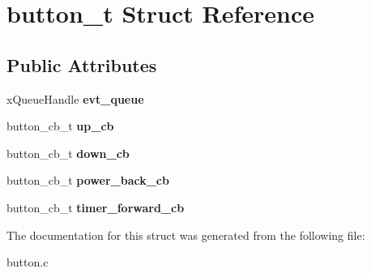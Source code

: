\hypertarget{structbutton__t}{}\section{button\+\_\+t Struct Reference}
\label{structbutton__t}
\subsection*{Public Attributes}
\begin{DoxyCompactItemize}
\item 
x\+Queue\+Handle {\bfseries evt\+\_\+queue}\hypertarget{structbutton__t_a1b49562b922bfa6733901f3941e76592}{}\label{structbutton__t_a1b49562b922bfa6733901f3941e76592}

\item 
button\+\_\+cb\+\_\+t {\bfseries up\+\_\+cb}\hypertarget{structbutton__t_a0f7bf91a815317f6c8b8025e61fd4f18}{}\label{structbutton__t_a0f7bf91a815317f6c8b8025e61fd4f18}

\item 
button\+\_\+cb\+\_\+t {\bfseries down\+\_\+cb}\hypertarget{structbutton__t_a5954e2d8114aedb195dcaf2b7f9deffa}{}\label{structbutton__t_a5954e2d8114aedb195dcaf2b7f9deffa}

\item 
button\+\_\+cb\+\_\+t {\bfseries power\+\_\+back\+\_\+cb}\hypertarget{structbutton__t_ad1daff28ff0f6b545761918323cada23}{}\label{structbutton__t_ad1daff28ff0f6b545761918323cada23}

\item 
button\+\_\+cb\+\_\+t {\bfseries timer\+\_\+forward\+\_\+cb}\hypertarget{structbutton__t_a495b02b0f34fd6799138646cf43350b0}{}\label{structbutton__t_a495b02b0f34fd6799138646cf43350b0}

\end{DoxyCompactItemize}


The documentation for this struct was generated from the following file\+:\begin{DoxyCompactItemize}
\item 
button.\+c\end{DoxyCompactItemize}
